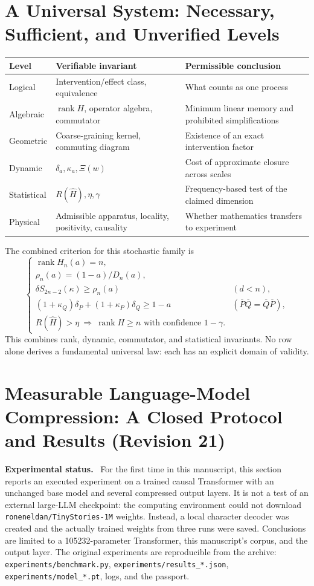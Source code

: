 \documentclass[11pt,a4paper,oneside]{book}
\DeclareMathOperator{\rank}{rank}\DeclareMathOperator{\Tr}{Tr}
\newcommand{\note}[1]{\par\medskip\noindent\textbf{#1}\ }
\begin{document}
\chapter{A Universal System: Necessary, Sufficient, and Unverified Levels}
\begin{center}\small\begin{tabularx}{\textwidth}{@{}p{}XX@{}}\toprule
Level&Verifiable invariant&Permissible conclusion\\\midrule
Logical&Intervention/effect class, equivalence&What counts as one process\\
Algebraic&$\rank H$, operator algebra, commutator&Minimum linear memory and prohibited simplifications\\
Geometric&Coarse-graining kernel, commuting diagram&Existence of an exact intervention factor\\
Dynamic&$\delta_a,\kappa_a,\Xi(w)$&Cost of approximate closure across scales\\
Statistical&$R(\widehat H),\eta,\gamma$&Frequency-based test of the claimed dimension\\
Physical&Admissible apparatus, locality, positivity, causality&Whether mathematics transfers to experiment\\\bottomrule
\end{tabularx}\end{center}
The combined criterion for this stochastic family is
\begin{equation}\begin{cases}
\rank H_n(a)=n,\\
\rho_n(a)=(1-a)/D_n(a),\\
\delta S_{2n-2}(\kappa)\ge\rho_n(a)&(d<n),\\
(1+\kappa_Q)\delta_P+(1+\kappa_P)\delta_Q\ge1-a&(\overline P\overline Q=\overline Q\overline P),\\
R(\widehat H)>\eta\ \Longrightarrow\ \rank H\ge n\text{ with confidence }1-\gamma.
\end{cases}\tag{102}\end{equation}
This combines rank, dynamic, commutator, and statistical invariants. No row alone derives a fundamental universal law: each has an explicit domain of validity.
\chapter{Measurable Language-Model Compression: A Closed Protocol and Results (Revision 21)}
\note{Experimental status.} For the first time in this manuscript, this section reports an executed experiment on a trained causal Transformer with an unchanged base model and several compressed output layers. It is not a test of an external large-LLM checkpoint: the computing environment could not download \texttt{roneneldan/TinyStories-1M} weights. Instead, a local character decoder was created and the actually trained weights from three runs were saved. Conclusions are limited to a 105232-parameter Transformer, this manuscript's corpus, and the output layer. The original experiments are reproducible from the archive: \texttt{experiments/benchmark.py}, \texttt{experiments/results\_*.json}, \texttt{experiments/model\_*.pt}, logs, and the passport.
\end{document}
